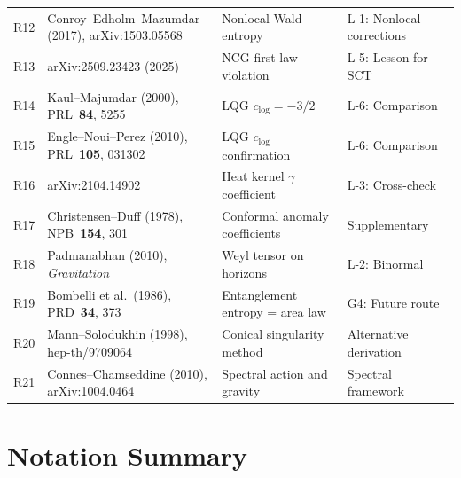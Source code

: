 \documentclass[12pt,a4paper]{article}
\theoremstyle{definition}
\theoremstyle{remark}
\begin{document}
\begin{center}
\begin{longtable}{p{0.7cm}p{5.5cm}p{3.5cm}p{3.8cm}}
R12 & Conroy--Edholm--Mazumdar (2017), arXiv:1503.05568
  & Nonlocal Wald entropy
  & L-1: Nonlocal corrections \\
R13 & arXiv:2509.23423 (2025)
  & NCG first law violation
  & L-5: Lesson for SCT \\
R14 & Kaul--Majumdar (2000), PRL~\textbf{84}, 5255
  & LQG $c_{\log} = -3/2$
  & L-6: Comparison \\
R15 & Engle--Noui--Perez (2010), PRL~\textbf{105}, 031302
  & LQG $c_{\log}$ confirmation
  & L-6: Comparison \\
R16 & arXiv:2104.14902
  & Heat kernel $\gamma$ coefficient
  & L-3: Cross-check \\
R17 & Christensen--Duff (1978), NPB~\textbf{154}, 301
  & Conformal anomaly coefficients
  & Supplementary \\
R18 & Padmanabhan (2010), \textit{Gravitation}
  & Weyl tensor on horizons
  & L-2: Binormal \\
R19 & Bombelli et al.\ (1986), PRD~\textbf{34}, 373
  & Entanglement entropy = area law
  & G4: Future route \\
R20 & Mann--Solodukhin (1998), hep-th/9709064
  & Conical singularity method
  & Alternative derivation \\
R21 & Connes--Chamseddine (2010), arXiv:1004.0464
  & Spectral action and gravity
  & Spectral framework \\
\bottomrule
\end{longtable}
\end{center}


\section{Notation Summary}
\label{sec:notation}
\end{document}
